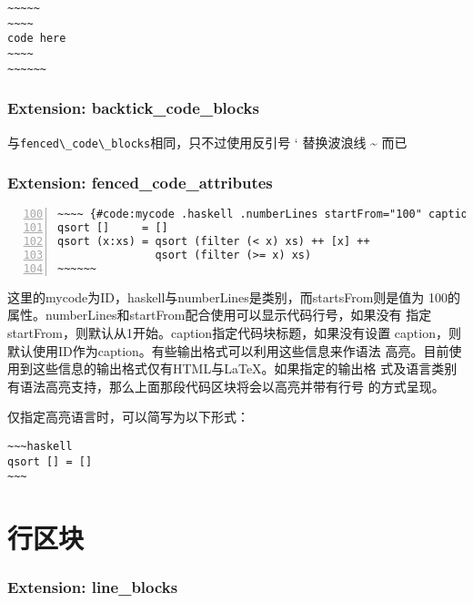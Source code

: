 \documentclass[fancyhdr,bookmark]{ctexbook}
\newcommand{\passthrough}[1]{#1}
\begin{document}
\begin{lstlisting}
~~~~~
~~~~
code here
~~~~
~~~~~~
\end{lstlisting}

\hypertarget{extension-backtick_code_blocks}{%
\subsubsection{Extension:
backtick\_code\_blocks}\label{extension-backtick_code_blocks}}

与\passthrough{\lstinline!fenced\_code\_blocks!}相同，只不过使用反引号 `
替换波浪线 \textasciitilde{} 而已

\hypertarget{extension-fenced_code_attributes}{%
\subsubsection{Extension:
fenced\_code\_attributes}\label{extension-fenced_code_attributes}}

\begin{lstlisting}[numbers=left, firstnumber=100, caption=围栏式代码块, label=code:fencedcode, float=htbp]
~~~~ {#code:mycode .haskell .numberLines startFrom="100" caption="围栏式代码块"}
qsort []     = []
qsort (x:xs) = qsort (filter (< x) xs) ++ [x] ++
               qsort (filter (>= x) xs)
~~~~~~
\end{lstlisting}

这里的mycode为ID，haskell与numberLines是类别，而startsFrom则是值为
100的属性。numberLines和startFrom配合使用可以显示代码行号，如果没有
指定startFrom，则默认从1开始。caption指定代码块标题，如果没有设置
caption，则默认使用ID作为caption。有些输出格式可以利用这些信息来作语法
高亮。目前使用到这些信息的输出格式仅有HTML与LaTeX。如果指定的输出格
式及语言类别有语法高亮支持，那么上面那段代码区块将会以高亮并带有行号
的方式呈现。

仅指定高亮语言时，可以简写为以下形式：

\begin{lstlisting}
~~~haskell
qsort [] = []
~~~
\end{lstlisting}

\hypertarget{ux884cux533aux5757}{%
\section{行区块}\label{ux884cux533aux5757}}

\hypertarget{extension-line_blocks}{%
\subsubsection{Extension: line\_blocks}\label{extension-line_blocks}}
\end{document}
